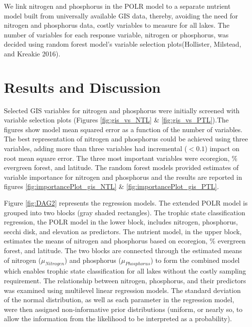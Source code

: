 \documentclass[fleqn,10pt,lineno]{wlpeerj} %
\begin{document}
We link nitrogen and phosphorus in the POLR model to a separate nutrient model built from universally available GIS data, thereby, avoiding the need for nitrogen and phosphorus data, costly variables to measure for all lakes. The number of variables for each response variable, nitrogen or phosphorus, was decided using random forest model's variable selection plots(Hollister, Milstead, and Kreakie 2016).

\hypertarget{results-and-discussion}{%
\section*{Results and Discussion}\label{results-and-discussion}}

Selected GIS variables for nitrogen and phosphorus were initially screened with variable selection plots (Figures \ref{fig:gis_vs_NTL} \& \ref{fig:gis_vs_PTL}).The figures show model mean squared error as a function of the number of variables. The best representation of nitrogen and phosphorus could be achieved using three variables, adding more than three variables had incremental (\(<0.1\)) impact on root mean square error. The three most important variables were ecoregion, \% evergreen forest, and latitude. The random forest models provided estimates of variable importance for nitrogen and phosphorus and the results are reported in figures \ref{fig:importancePlot_gis_NTL} \& \ref{fig:importancePlot_gis_PTL}.

Figure \ref{fig:DAG2} represents the regression models. The extended POLR model is grouped into two blocks (gray shaded rectangles). The trophic state classification regression, the POLR model in the lower block, includes nitrogen, phosphorus, secchi disk, and elevation as predictors. The nutrient model, in the upper block, estimates the means of nitrogen and phosphorus based on ecoregion, \% evergreen forest, and latitude. The two blocks are connected through the estimated means of nitrogen (\(\mu_{Nitrogen}\)) and phosphorus (\(\mu_{Phosphorus}\)) to form the combined model which enables trophic state classification for all lakes without the costly sampling requirement. The relationship between nitrogen, phosphorus, and their predictors was examined using multilevel linear regression models. The standard deviation of the normal distribution, as well as each parameter in the regression model, were then assigned non-informative prior distributions (uniform, or nearly so, to allow the information from the likelihood to be interpreted as a probability).
\end{document}
